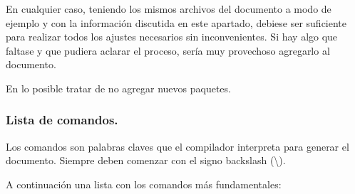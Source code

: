 En cualquier caso, teniendo los mismos archivos  del documento a modo de ejemplo y con la información discutida en este apartado, debiese ser suficiente para realizar todos los ajustes necesarios sin inconvenientes. Si hay algo que faltase y que pudiera aclarar el proceso, sería muy provechoso agregarlo al documento.

En lo posible tratar de no agregar nuevos paquetes.

\subsubsection{Lista de comandos.}\label{flujo:listado-comandos-latex}
Los comandos son palabras claves que el compilador interpreta para generar el documento. Siempre deben comenzar con el signo backslash (\textbackslash).

\noindent A continuación una lista con los comandos más fundamentales:

